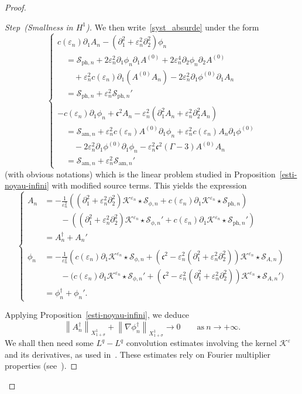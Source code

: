 \documentclass[AHL,Unicode,longabstracts,published]{cedram}
\newcommand*\p{\partial}
\newcommand{\amm}{\mathrm{am}}
\newcommand{\phl}{\mathrm{ph}}
\newcommand*\BK{\mathcal{K}}
\newcommand*\BS{\mathcal{S}}
\newcommand*\ds{\displaystyle}
\newcommand*\cs{{\mathfrak c}}
\newcommand*\ii{\infty}
\newcommand*\e{\varepsilon}
\newcommand*\s{\sigma}
\newcounter{stepcount}
\newenvironment{step}[1]{\refstepcounter{stepcount}\begin{proof}[{Step~\thestepcount}{\;(#1)}]}{\let\qed\relax\end{proof}}
\begin{document}
\begin{proof}
\begin{step}{{Smallness in $ H^1 $}}
We then write~\eqref{syst_absurde} under the form
\begin{equation*}
\left\{
\begin{array}{ll}
c(\e_n) \p_{1} A_n - \left(\p_{1}^2 + \e_n^2 \p^2_{2}\right) \phi_n
\\
\quad = \BS_{{\phl},n} + 2 \e_n^2 \p_{1} \phi_n \p_{1} A^{(0)} + 2 \e_n^4 \p_{2} \phi_n \p_{2} A^{(0)}
\\
\qquad + \e_n^2 c(\e_n) \p_1 \left(A^{(0)} A_n\right) - 2 \e_n^2 \p_{1} \phi^{(0)} \p_{1} A_n
\\
\quad = \BS_{{\phl},n} + \e_n^2 \BS_{{\phl},n}'
\\ \ \\
- c(\e_n) \p_{1} \phi_n + \cs^2 A_n - \e_n^2 \left(\p_{1}^2 A_n + \e_n^2 \p_{2}^2 A_n\right)
\\
\quad = \BS_{{\amm},n} + \e_n^2 c(\e_n) A^{(0)} \p_1 \phi_n + \e_n^2 c(\e_n) A_n \p_1 \phi^{(0)}
\\
\qquad- 2 \e_n^2 \p_{1} \phi^{(0)} \p_{1} \phi_n - \e_n^2 \cs^2 (\Gamma -3) A^{(0)} A_n
\\
\quad = \BS_{{\amm},n} + \e_n^2 \BS_{{\amm},n}'
\end{array}\right.
\end{equation*}
(with obvious notations) which is the linear problem studied in Proposition~\ref{esti-noyau-infini} with modified source terms. This yields the expression
\[
\left\{
\begin{array}{ll}
 A_n &= \ds{- \frac{1}{\e_n^2} \left(\left(\p_1^2 + \e_n^2 \p_2^2\right) \BK^{\e_n} \star \BS_{\phi,n} + c(\e_n) \p_1 \BK^{\e_n} \star \BS_{{\phl},n} \right)} 
\\ &\qquad - \left(\left(\p_1^2 + \e_n^2 \p_2^2\right) \BK^{\e_n} \star \BS_{\phi,n}' + c(\e_n) \p_1 \BK^{\e_n} \star \BS_{{\phl},n}' \right)
\\ &= A_n^\dag + A_n'
\\ \ \\
\phi_n &=\ds{ - \frac{1}{\e_n^2} \left(c(\e_n) \p_1 \BK^{\e_n} \star \BS_{\phi,n} + \left(\cs^2 - \e_n^2 \left(\p_1^2 + \e_n^2 \p_2^2\right)\right) \BK^{\e_n} \star \BS_{ A, n} \right)}
\\ &\qquad - \big(c(\e_n) \p_1 \BK^{\e_n} \star \BS_{\phi,n}' + (\cs^2 - \e_n^2 (\p_1^2 + \e_n^2 \p_2^2)) \BK^{\e_n} \star \BS_{A, n}' \big)\\
&= \phi_n^\dag + \phi_n'.
\end{array}\right.
\]

Applying Proposition~\ref{esti-noyau-infini}, we deduce
\begin{equation}\label{apriori_26}
\left\| A_n^\dag \right\|_{X^1_{1+\s}} + \left\| \nabla \phi_n^\dag \right\|_{X^1_{1+\s}} \to 0
\qquad \text{as} \ n \to +\ii.
\end{equation} We shall then need some $ L^q-L^q $ convolution estimates involving the kernel $ \BK^\e $ and its derivatives, as used in~\cite[Lemma~5.2]{BGStranso2d}. These estimates rely on Fourier multiplier properties (see~\cite{Liz,Mus-Pip-Tao-Thi}).




\end{step}
\end{proof}
\end{document}
